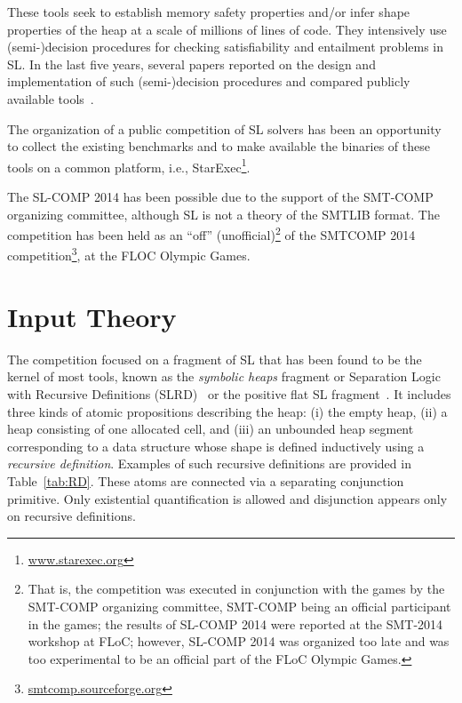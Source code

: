 \documentclass[twoside,11pt]{article}
\begin{document}
These tools seek to establish memory safety properties and/or infer shape properties of the heap at a scale of millions of lines of code.
They intensively use (semi-)decision procedures for checking satisfiability and entailment problems in SL.
In the last five years, several papers reported on the design and implementation of such (semi-)decision procedures and compared publicly available tools~\cite{HasseIOP13}.

The organization of a public competition of SL solvers has been an opportunity 
to collect the existing benchmarks and  
to make available the binaries of these tools on a common platform, i.e., StarExec\footnote{\url{www.starexec.org}}.

The SL-COMP 2014 has been possible due to the support of the SMT-COMP organizing committee, 
although SL is not a theory of the SMTLIB format.
The competition has been held as an ``off'' (unofficial)\footnote{That is, the competition was executed in conjunction with the games by the SMT-COMP organizing committee, SMT-COMP being an official participant in the games; the results of SL-COMP 2014 were reported at the SMT-2014 workshop at FLoC; however, SL-COMP 2014 was organized too late and was too experimental to be an official part of the FLoC Olympic Games.}
of the SMTCOMP 2014 competition\footnote{\url{smtcomp.sourceforge.org}}, at the FLOC Olympic Games.


\section{Input Theory}

The competition focused on a fragment of SL that has been found to be the kernel of most tools, known 
as
the \emph{symbolic heaps} fragment
or Separation Logic with Recursive Definitions (SLRD)~\cite{IosifRS13} or
the positive flat SL fragment~\cite{AntonopoulosGHKO14}. 
It includes three kinds of atomic propositions describing the heap:
(i) the empty heap, 
(ii) a heap consisting of one allocated cell, and
(iii) an unbounded heap segment corresponding to a data structure whose shape is defined inductively using a \emph{recursive definition}. 
Examples of such recursive definitions are provided in Table~\ref{tab:RD}.
These atoms are connected via a separating conjunction primitive. 
Only existential quantification is allowed and 
disjunction appears only on recursive definitions. 
\end{document}
